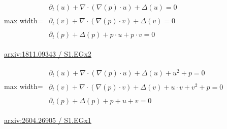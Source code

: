 \documentclass[UTF8,10pt,a4paper,fontset=mac]{ctexart}
\begin{document}
\begin{minipage}{\linewidth}\begin{center}\begin{adjustbox}{max width=\linewidth}$\displaystyle\begin{gathered}\begin{gathered}\partial_{t}(u)+\nabla\cdot(\nabla(p)\cdot u)+\Delta(u)=0\end{gathered}\\[5pt]\begin{gathered}\partial_{t}(v)+\nabla\cdot(\nabla(p)\cdot v)+\Delta(v)=0\end{gathered}\\[5pt]\begin{gathered}\partial_{t}(p)+\Delta(p)+p\cdot u+p\cdot v=0\end{gathered}\end{gathered}$\end{adjustbox}\end{center}{\small\href{https://arxiv.org/html/1811.09343#S1.EGx2}{arxiv:1811.09343 / S1.EGx2}}\par\end{minipage}\par\vspace{6mm}

\begin{minipage}{\linewidth}\begin{center}\begin{adjustbox}{max width=\linewidth}$\displaystyle\begin{gathered}\begin{gathered}\partial_{t}(u)+\nabla\cdot(\nabla(p)\cdot u)+\Delta(u)+u^{2}+p=0\end{gathered}\\[5pt]\begin{gathered}\partial_{t}(v)+\nabla\cdot(\nabla(p)\cdot v)+\Delta(v)+u\cdot v+v^{2}+p=0\end{gathered}\\[5pt]\begin{gathered}\partial_{t}(p)+\Delta(p)+p+u+v=0\end{gathered}\end{gathered}$\end{adjustbox}\end{center}{\small\href{https://arxiv.org/html/2604.26905#S1.EGx1}{arxiv:2604.26905 / S1.EGx1}}\par\end{minipage}\par\vspace{6mm}
\end{document}
